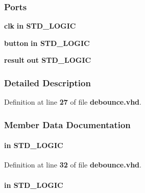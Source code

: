\subsubsection*{Ports}
 \begin{DoxyCompactItemize}
\item 
{\bf clk}  {\bfseries {\bfseries \textcolor{keywordflow}{in}\textcolor{vhdlchar}{ }}} {\bfseries \textcolor{comment}{S\+T\+D\+\_\+\+L\+O\+G\+IC}\textcolor{vhdlchar}{ }} 
\item 
{\bf button}  {\bfseries {\bfseries \textcolor{keywordflow}{in}\textcolor{vhdlchar}{ }}} {\bfseries \textcolor{comment}{S\+T\+D\+\_\+\+L\+O\+G\+IC}\textcolor{vhdlchar}{ }} 
\item 
{\bf result}  {\bfseries {\bfseries \textcolor{keywordflow}{out}\textcolor{vhdlchar}{ }}} {\bfseries \textcolor{comment}{S\+T\+D\+\_\+\+L\+O\+G\+IC}\textcolor{vhdlchar}{ }} 
\end{DoxyCompactItemize}


\subsubsection{Detailed Description}


Definition at line {\bf 27} of file {\bf debounce.\+vhd}.



\subsubsection{Member Data Documentation}
\paragraph[{button}]{ {\bfseries \textcolor{keywordflow}{in}\textcolor{vhdlchar}{ }} {\bfseries \textcolor{comment}{S\+T\+D\+\_\+\+L\+O\+G\+IC}\textcolor{vhdlchar}{ }} \hspace{0.3cm}{\ttfamily [Port]}}\label{classdebounce_a01868ea335416803ee4790264162da99}


Definition at line {\bf 32} of file {\bf debounce.\+vhd}.

\paragraph[{clk}]{ {\bfseries \textcolor{keywordflow}{in}\textcolor{vhdlchar}{ }} {\bfseries \textcolor{comment}{S\+T\+D\+\_\+\+L\+O\+G\+IC}\textcolor{vhdlchar}{ }} \hspace{0.3cm}{\ttfamily [Port]}}\label{classdebounce_a6231b307b7958b6060563aa2a93d345a}



